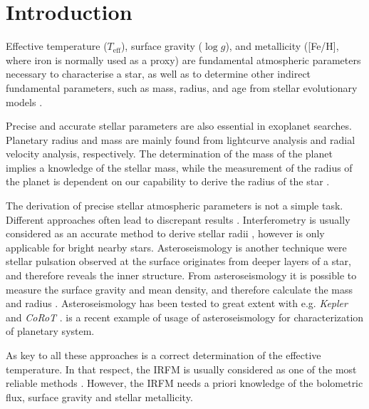 \documentclass{aa}
\begin{document}
\maketitle



\section{Introduction}
\label{sec:introduction}

Effective temperature ($T_\mathrm{eff}$), surface gravity ($\log g$),
and metallicity ([Fe/H], where iron is normally used as a proxy)
are fundamental atmospheric parameters necessary to characterise a
star, as well as to determine other indirect fundamental parameters,
such as mass, radius, and age from stellar evolutionary models
\citep[e.g.][]{Girardi2000}.

Precise and accurate stellar parameters are also essential in
exoplanet searches. Planetary radius and mass are mainly found from
lightcurve analysis and radial velocity analysis, respectively. The
determination of the mass of the planet implies a knowledge of the
stellar mass, while the measurement of the radius of the planet
is dependent on our capability to derive the radius of the star
\citep{Ammler2009,Torres2008,Torres2012}.

The derivation of precise stellar atmospheric parameters is not a
simple task. Different approaches often lead to discrepant results
\citep[see e.g.][]{Santos13}. Interferometry is usually considered as an
accurate method to derive stellar radii \citep[e.g.][]{Boyajian2012},
however is only applicable for bright nearby stars. Asteroseismology
is another technique were stellar pulsation observed at the surface
originates from deeper layers of a star, and therefore reveals the
inner structure. From asteroseismology it is possible to measure
the surface gravity and mean density, and therefore calculate the
mass and radius \citep[e.g.][]{Kjeldsen1995}. Asteroseismology has
been tested to great extent with e.g. \emph{Kepler} and \emph{CoRoT}
\citep{Michel2008,Huber2011,Huber2012}. \cite{Campante2015} is a recent
example of usage of asteroseismology for characterization of planetary
system.

As key to all these approaches is a correct determination
of the effective temperature. In that respect, the IRFM
is usually considered as one of the most reliable methods
\citep{Blackwell1977,Ramirez2005b,Casagrande2010}. However, the IRFM
needs a priori knowledge of the bolometric flux, surface gravity and
stellar metallicity.
\end{document}
